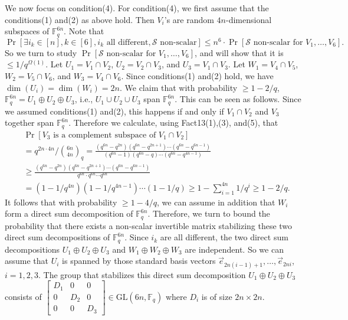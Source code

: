 \documentclass[10pt,a4paper]{article}
\begin{document}
We now focus on condition(4). For condition(4), we first assume that the conditions(1) and(2) as above hold. Then $V_i$'s are random $4n$-dimensional subspaces of $\mathbb F_q^{6n}$. Note that
\[\Pr[\exists i_k\in[n],k\in[6],i_k\text{ all different},\mathcal S\text{ non-scalar}]\le n^6\cdot\Pr[\mathcal S\text{ non-scalar for }V_1,\ldots,V_6].\]
So we turn to study $\Pr[\mathcal S\text{ non-scalar for }V_1,\ldots,V_6]$, and will show that it is $\le1/q^{\Omega(1)}$.
Let $U_1=V_1\cap V_2$, $U_2=V_2\cap V_3$, and $U_3=V_1\cap V_3$. Let $W_1=V_4\cap V_5$, $W_2=V_5\cap V_6$, and $W_3=V_4\cap V_6$. Since conditions(1) and(2) hold, we have $\dim(U_i)=\dim(W_i)=2n$. We claim that with probability $\ge1-2/q$, $\mathbb F_q^{6n}=U_1\oplus U_2\oplus U_3$, i.e., $U_1\cup U_2\cup U_3$ span $\mathbb F_q^{6n}$. This can be seen as follows. Since we assumed conditions(1) and(2), this happens if and only if $V_1\cap V_2$ and $V_3$ together span $\mathbb F_q^{6n}$. Therefore we calculate, using Fact13(1),(3), and(5), that
\begin{align*}
&\Pr[V_3\text{ is a complement subspace of }V_1\cap V_2]\\
&=q^{2n\cdot4n}/\binom{6n}{4n}_q
=\frac{(q^{6n}-q^{2n})(q^{6n}-q^{2n+1})\cdots(q^{6n}-q^{6n-1})}{(q^{6n}-1)(q^{6n}-q)\cdots(q^{6n}-q^{4n-1})}\\
&\ge\frac{(q^{6n}-q^{2n})(q^{6n}-q^{2n+1})\cdots(q^{6n}-q^{6n-1})}{q^{6n}\cdot q^{6n}\cdots q^{6n}}\\
&=(1-1/q^{4n})(1-1/q^{4n-1})\cdots(1-1/q)\ge1-\sum_{i=1}^{4n}1/q^i\ge1-2/q.
\end{align*}
It follows that with probability $\ge1-4/q$, we can assume in addition that $W_i$ form a direct sum decomposition of $\mathbb F_q^{6n}$.
Therefore, we turn to bound the probability that there exists a non-scalar invertible matrix stabilizing these two direct sum decompositions of $\mathbb F_q^{6n}$. Since $i_k$ are all different, the two direct sum decompositions $U_1\oplus U_2\oplus U_3$ and $W_1\oplus W_2\oplus W_3$ are independent.
So we can assume that $U_i$ is spanned by those standard basis vectors $\vec e_{2n(i-1)+1},\ldots,\vec e_{2ni}$, $i=1,2,3$. The group that stabilizes this direct sum decomposition $U_1\oplus U_2\oplus U_3$ consists of $\begin{bmatrix}D_1&0&0\\0&D_2&0\\0&0&D_3\end{bmatrix}\in\mathrm{GL}(6n,\mathbb F_q)$ where $D_i$ is of size $2n\times2n$.
\end{document}
